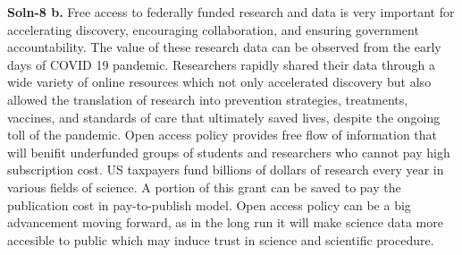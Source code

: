 \documentclass{article}
\begin{document}
\begin{enumerate}
        \textbf{Soln-8 b.} Free access to federally funded research and data is very important for accelerating discovery, 
                        encouraging collaboration, and ensuring government accountability. The value of these research data can 
                        be observed from the early days of COVID 19 pandemic. Researchers rapidly shared their data through a 
                        wide variety of online resources which not only accelerated discovery but also allowed the translation 
                        of research into prevention strategies, treatments, vaccines, and standards of care that ultimately saved 
                        lives, despite the ongoing toll of the pandemic. Open access policy provides free flow of information that 
                        will benifit underfunded groups of students and researchers who cannot pay high subscription cost. US taxpayers 
                        fund billions of dollars of research every year in various fields of science. A portion of this 
                        grant can be saved to pay the publication cost in pay-to-publish model. Open access policy can be a 
                        big advancement moving forward, as in the long run it will make science data more accesible to public which 
                        may induce trust in science and scientific procedure.

\end{enumerate}
\end{document}
